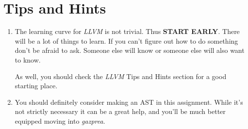 \documentclass{article}
\begin{document}
\section{Tips and Hints}
\begin{enumerate}
  \item
    The learning curve for \textit{LLVM} is not trivial. Thus \textbf{START EARLY}. There will be a
    lot of things to learn. If you can't figure out how to do something don't be afraid to ask.
    Someone else will know or someone else will also want to know.

    As well, you should check the \textit{LLVM} Tips and Hints section for a good starting place.
  \item
    You should definitely consider making an AST in this assignment. While it's not strictly
    necessary it can be a great help, and you'll be much better equipped moving into
    \textit{gazprea}.


\end{enumerate}
\end{document}
